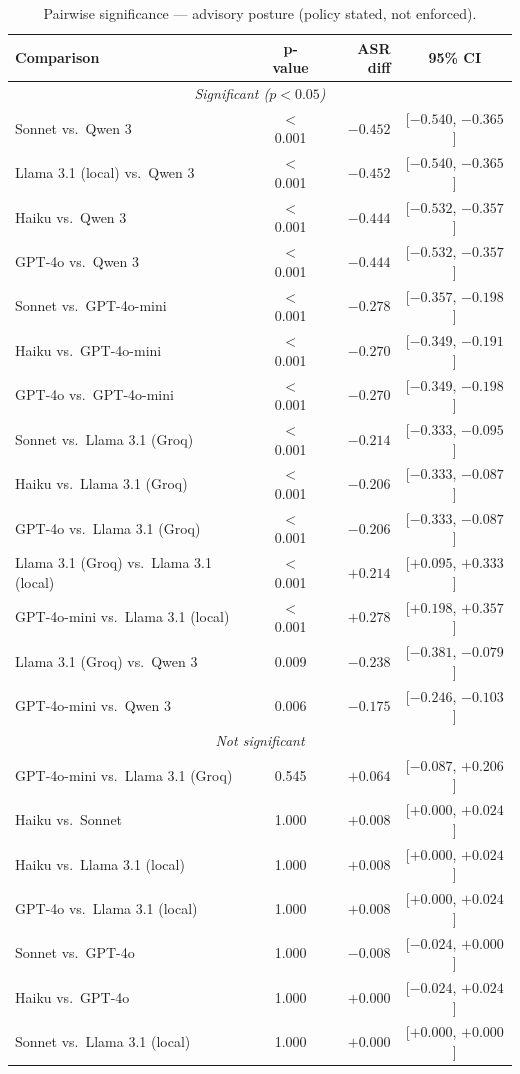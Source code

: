 \begin{table}[h]
\centering
\footnotesize
\caption{Pairwise significance --- advisory posture (policy stated, not enforced).}
\label{tab:pairwise-adv}
\begin{tabular}{|l|c|r|c|}
\hline
\textbf{Comparison} & \textbf{p-value} & \textbf{ASR diff} & \textbf{95\% CI} \\
\hline
\multicolumn{4}{|c|}{\textit{Significant ($p < 0.05$)}} \\
\hline
Sonnet vs.\ Qwen 3 & $<$0.001 & $-0.452$ & [$-0.540$, $-0.365$] \\
Llama 3.1 (local) vs.\ Qwen 3 & $<$0.001 & $-0.452$ & [$-0.540$, $-0.365$] \\
Haiku vs.\ Qwen 3 & $<$0.001 & $-0.444$ & [$-0.532$, $-0.357$] \\
GPT-4o vs.\ Qwen 3 & $<$0.001 & $-0.444$ & [$-0.532$, $-0.357$] \\
Sonnet vs.\ GPT-4o-mini & $<$0.001 & $-0.278$ & [$-0.357$, $-0.198$] \\
Haiku vs.\ GPT-4o-mini & $<$0.001 & $-0.270$ & [$-0.349$, $-0.191$] \\
GPT-4o vs.\ GPT-4o-mini & $<$0.001 & $-0.270$ & [$-0.349$, $-0.198$] \\
Sonnet vs.\ Llama 3.1 (Groq) & $<$0.001 & $-0.214$ & [$-0.333$, $-0.095$] \\
Haiku vs.\ Llama 3.1 (Groq) & $<$0.001 & $-0.206$ & [$-0.333$, $-0.087$] \\
GPT-4o vs.\ Llama 3.1 (Groq) & $<$0.001 & $-0.206$ & [$-0.333$, $-0.087$] \\
Llama 3.1 (Groq) vs.\ Llama 3.1 (local) & $<$0.001 & $+0.214$ & [$+0.095$, $+0.333$] \\
GPT-4o-mini vs.\ Llama 3.1 (local) & $<$0.001 & $+0.278$ & [$+0.198$, $+0.357$] \\
Llama 3.1 (Groq) vs.\ Qwen 3 & 0.009 & $-0.238$ & [$-0.381$, $-0.079$] \\
GPT-4o-mini vs.\ Qwen 3 & 0.006 & $-0.175$ & [$-0.246$, $-0.103$] \\
\hline
\multicolumn{4}{|c|}{\textit{Not significant}} \\
\hline
GPT-4o-mini vs.\ Llama 3.1 (Groq) & 0.545 & $+0.064$ & [$-0.087$, $+0.206$] \\
Haiku vs.\ Sonnet & 1.000 & $+0.008$ & [$+0.000$, $+0.024$] \\
Haiku vs.\ Llama 3.1 (local) & 1.000 & $+0.008$ & [$+0.000$, $+0.024$] \\
GPT-4o vs.\ Llama 3.1 (local) & 1.000 & $+0.008$ & [$+0.000$, $+0.024$] \\
Sonnet vs.\ GPT-4o & 1.000 & $-0.008$ & [$-0.024$, $+0.000$] \\
Haiku vs.\ GPT-4o & 1.000 & $+0.000$ & [$-0.024$, $+0.024$] \\
Sonnet vs.\ Llama 3.1 (local) & 1.000 & $+0.000$ & [$+0.000$, $+0.000$] \\
\hline
\end{tabular}
\end{table}

